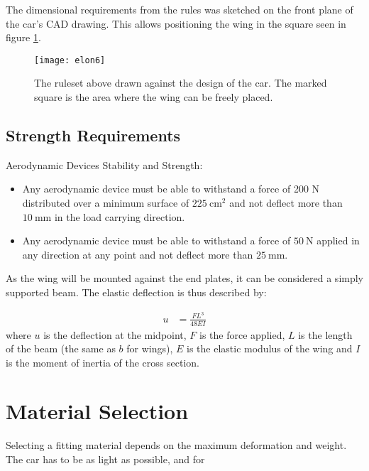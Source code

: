     The dimensional requirements from the rules was sketched on the front plane of the car's CAD drawing. This allows positioning the wing in the square seen in figure \ref{fig:cadplacement}.

    \begin{figure}
      \texttt{[image: elon6]}
      \caption{The ruleset above drawn against the design of the car. The marked square is the area where the wing can be freely placed.}
      \label{fig:cadplacement}
    \end{figure}

  \subsection{Strength Requirements}
    \begin{tcolorbox}
      Aerodynamic Devices Stability and Strength:
      \begin{itemize}
        \item [T7.5.1] Any aerodynamic device must be able to withstand a force of 200 N distributed over a minimum surface of $\SI{225}{\centi\metre\squared}$ and not deflect more than $\SI{10}{\milli\metre}$ in the load carrying direction.
        \item [T7.5.2] Any aerodynamic device must be able to withstand a force of $\SI{50}{\newton}$ applied in any direction at any point and not deflect more than $\SI{25}{\milli\metre}$.
      \end{itemize}
    \end{tcolorbox}

    As the wing will be mounted against the end plates, it can be considered a simply supported beam. The elastic deflection is thus described by:

    \begin{align}
      u &= \frac{FL^3}{48EI}
    \end{align}
    where $u$ is the deflection at the midpoint, $F$ is the force applied, $L$ is the length of the beam (the same as $b$ for wings), $E$ is the elastic modulus of the wing and $I$ is the moment of inertia of the cross section.

\section{Material Selection}

  Selecting a fitting material depends on the maximum deformation and weight. The car has to be as light as possible, and for

